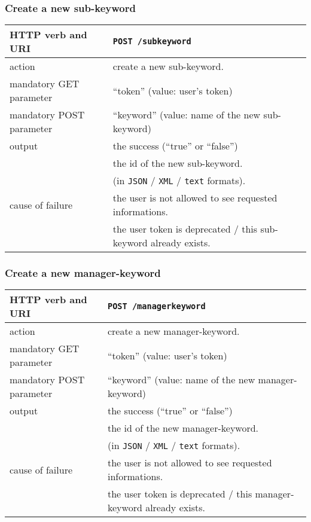 \subsubsection{Create a new sub-keyword}
\begin{tabular}{ | l | l | }
	\hline
	HTTP verb and URI & \texttt{POST /subkeyword} \\
	\hline
	action & create a new sub-keyword. \\
	\hline
	mandatory GET parameter & ``token'' (value: user's token) \\
	\hline
	mandatory POST parameter & ``keyword'' (value: name of the new sub-keyword) \\
	\hline
	output & the success (``true'' or ``false'')  \\
	\space & the id of the new sub-keyword.  \\
	\space & (in \texttt{JSON} / \texttt{XML} / \texttt{text} formats). \\
	\hline
	cause of failure & the user is not allowed to see requested informations. \\
	\space & the user token is deprecated / this sub-keyword already exists. \\
	\hline
\end{tabular}
\newline

\subsubsection{Create a new manager-keyword}
\begin{tabular}{ | l | l | }
	\hline
	HTTP verb and URI & \texttt{POST /managerkeyword} \\
	\hline
	action & create a new manager-keyword. \\
	\hline
	mandatory GET parameter & ``token'' (value: user's token) \\
	\hline
	mandatory POST parameter & ``keyword'' (value: name of the new manager-keyword) \\
	\hline
	output & the success (``true'' or ``false'')  \\
	\space & the id of the new manager-keyword.  \\
	\space & (in \texttt{JSON} / \texttt{XML} / \texttt{text} formats). \\
	\hline
	cause of failure & the user is not allowed to see requested informations. \\
	\space & the user token is deprecated / this manager-keyword already exists. \\
	\hline
\end{tabular}
\newline


